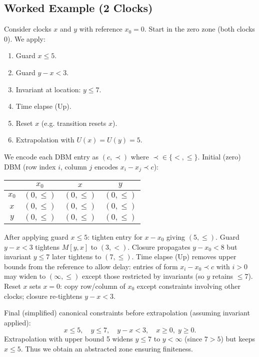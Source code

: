 \subsection{Worked Example (2 Clocks)}
Consider clocks $x$ and $y$ with reference $x_0=0$. Start in the zero zone (both clocks 0). We apply:
\begin{enumerate}
  \item Guard $x \le 5$.
  \item Guard $y - x < 3$.
  \item Invariant at location: $y \le 7$.
  \item Time elapse (Up).
  \item Reset $x$ (e.g. transition resets $x$).
  \item Extrapolation with $U(x)=U(y)=5$.
\end{enumerate}

We encode each DBM entry as $(c,\prec)$ where $\prec \in \{<,\le\}$. Initial (zero) DBM (row index $i$, column $j$ encodes $x_i - x_j \prec c$):
\begin{center}
\begin{tabular}{c|ccc}
 & $x_0$ & $x$ & $y$ \\\hline
$x_0$ & $(0,\le)$ & $(0,\le)$ & $(0,\le)$ \\
$x$   & $(0,\le)$ & $(0,\le)$ & $(0,\le)$ \\
$y$   & $(0,\le)$ & $(0,\le)$ & $(0,\le)$ \\
\end{tabular}
\end{center}

After applying guard $x \le 5$: tighten entry for $x - x_0$ giving $(5,\le)$. Guard $y - x < 3$ tightens $M[y,x]$ to $(3,<)$. Closure propagates $y - x_0 < 8$ but invariant $y \le 7$ later tightens to $(7,\le)$. Time elapse (Up) removes upper bounds from the reference to allow delay: entries of form $x_i - x_0 \prec c$ with $i>0$ may widen to $(\infty,\le)$ except those restricted by invariants (so $y$ retains $\le 7$). Reset $x$ sets $x=0$: copy row/column of $x_0$ except constraints involving other clocks; closure re-tightens $y - x < 3$.

Final (simplified) canonical constraints before extrapolation (assuming invariant applied):
\[
  x \le 5,\quad y \le 7,\quad y - x < 3,\quad x \ge 0,\; y \ge 0.
\]
Extrapolation with upper bound 5 widens $y \le 7$ to $y < \infty$ (since $7>5$) but keeps $x \le 5$. Thus we obtain an abstracted zone ensuring finiteness.

